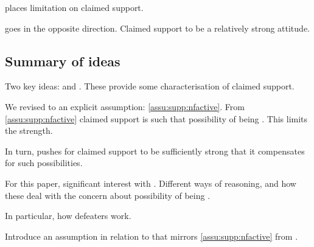 \begin{note}
  \ideaCSA{} places limitation on claimed support.

  \ideaCSB{} goes in the opposite direction.
  Claimed support to be a relatively strong attitude.
\end{note}

\subsection{Summary of ideas}
\label{sec:summary-1}

\begin{note}
  Two key ideas: \ideaCSA{} and \ideaCSB{}.
  These provide some characterisation of claimed support.

  We revised \ideaCSA{} to an explicit assumption: \autoref{assu:supp:nfactive}.
  From \autoref{assu:supp:nfactive} claimed support is such that possibility of being \mom{}.
  This limits the strength.

  In turn, \ideaCSB{} pushes for claimed support to be sufficiently strong that it compensates for such possibilities.

  For this paper, significant interest with \ideaCSB{}.
  Different ways of reasoning, and how these deal with the concern about possibility of being \mom{}.

  In particular, how defeaters work.

  Introduce an assumption in relation to \ideaCSB{} that mirrors \autoref{assu:supp:nfactive} from \ideaCSA{}.
\end{note}

